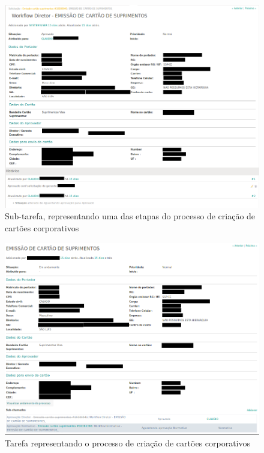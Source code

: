\begin{figure}[H]
\centering
\includegraphics[width=1\textwidth]{imagens/acessar_tarefa_pai.png}
\caption{Sub-tarefa, representando uma das etapas do processo de criação de cartões corporativos}
\label{fig:acessar_tarefa_pai}
\end{figure}

\begin{figure}[H]
\centering
\includegraphics[width=1\textwidth]{imagens/acessar_subtarefa.png}
\caption{Tarefa representando o processo de criação de cartões corporativos}
\label{fig:acessar_subtarefa}
\end{figure}

